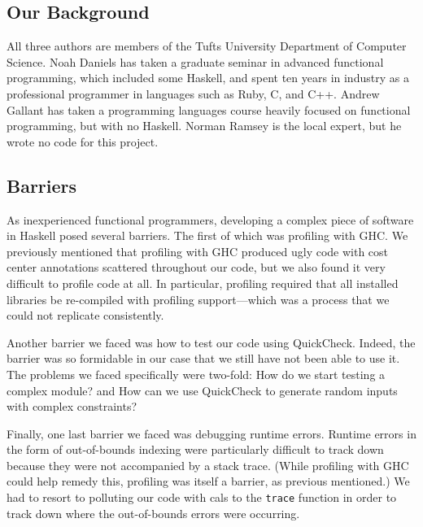 \documentclass[preprint,nonatbib,blockstyle,nocopyrightspace,times]{sigplanconf}
\begin{document}
\subsection{Our Background}

All three authors are members of the Tufts University Department of Computer
Science.
Noah Daniels has taken a graduate seminar in advanced functional
programming, which included some Haskell, and spent ten years in industry as a
professional programmer in languages such as Ruby, C, and C++.
Andrew Gallant has taken a programming languages course heavily focused on 
functional programming, but with no Haskell.
Norman Ramsey is the local expert, but he wrote no code for this project.

\subsection{Barriers}

As inexperienced functional programmers, developing a complex piece of
software in Haskell posed several barriers.
The first of which was profiling with GHC.
We previously mentioned that profiling with GHC produced ugly code with
cost center annotations scattered throughout our code, but we also found it
very difficult to profile code at all.
In particular, profiling required that all installed libraries be re-compiled
with profiling support---which was a process that we could not replicate
consistently.

Another barrier we faced was how to test our code using QuickCheck.
Indeed, the barrier was so formidable in our case that we still have not been 
able to use it.
The problems we faced specifically were two-fold: How do we start testing
a complex module? and How can we use QuickCheck to generate random inputs with 
complex constraints?

Finally, one last barrier we faced was debugging runtime errors.
Runtime errors in the form of out-of-bounds indexing were particularly 
difficult to track down because they were not accompanied by a stack trace.
(While profiling with GHC could help remedy this, profiling was itself a 
barrier, as previous mentioned.)
We had to resort to polluting our code with cals to the \texttt{trace} function 
in order to track down where the out-of-bounds errors were occurring.
\end{document}

